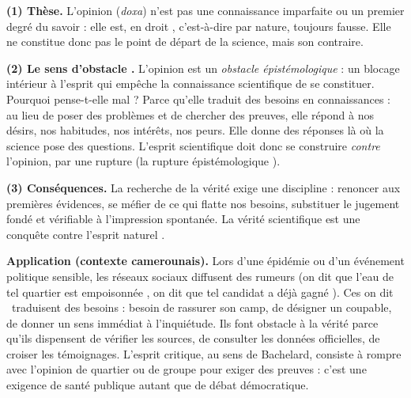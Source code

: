 \documentclass[11pt]{article}
\begin{document}
\begin{corrige}
\textbf{(1) Thèse.} L'opinion (\emph{doxa}) n'est pas une connaissance imparfaite ou un premier degré du savoir : elle est, \guillemotleft en droit \guillemotright, c'est-à-dire par nature, toujours fausse. Elle ne constitue donc pas le point de départ de la science, mais son contraire.

\textbf{(2) Le sens d'\guillemotleft obstacle \guillemotright.} L'opinion est un \emph{obstacle épistémologique} : un blocage intérieur à l'esprit qui empêche la connaissance scientifique de se constituer. Pourquoi pense-t-elle mal ? Parce qu'elle \guillemotleft traduit des besoins en connaissances \guillemotright : au lieu de poser des problèmes et de chercher des preuves, elle répond à nos désirs, nos habitudes, nos intérêts, nos peurs. Elle donne des réponses là où la science pose des questions. L'esprit scientifique doit donc se construire \emph{contre} l'opinion, par une rupture (la \guillemotleft rupture épistémologique \guillemotright).

\textbf{(3) Conséquences.} La recherche de la vérité exige une discipline : renoncer aux premières évidences, se méfier de ce qui flatte nos besoins, substituer le jugement fondé et vérifiable à l'impression spontanée. La vérité scientifique est une conquête contre l'esprit \guillemotleft naturel \guillemotright.

\textbf{Application (contexte camerounais).} Lors d'une épidémie ou d'un événement politique sensible, les réseaux sociaux diffusent des rumeurs (\guillemotleft on dit que l'eau de tel quartier est empoisonnée \guillemotright, \guillemotleft on dit que tel candidat a déjà gagné \guillemotright). Ces \guillemotleft on dit \guillemotright\ traduisent des besoins : besoin de rassurer son camp, de désigner un coupable, de donner un sens immédiat à l'inquiétude. Ils font obstacle à la vérité parce qu'ils dispensent de vérifier les sources, de consulter les données officielles, de croiser les témoignages. L'esprit critique, au sens de Bachelard, consiste à rompre avec l'opinion de quartier ou de groupe pour exiger des preuves : c'est une exigence de santé publique autant que de débat démocratique.
\end{corrige}
\end{document}
